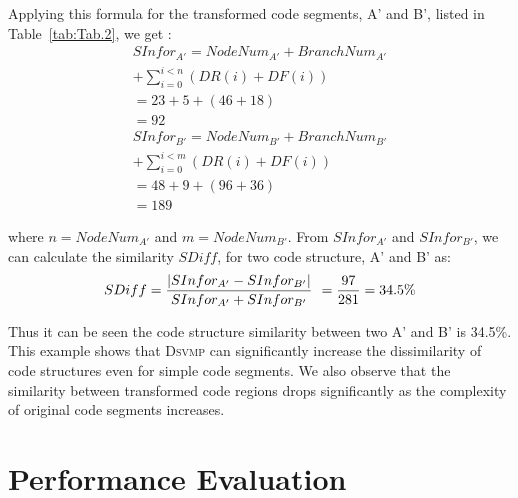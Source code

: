 \documentclass[conference]{IEEEtran}
\newcommand{\DSVMP}{\textsc{Dsvmp}\xspace}
\begin{document}
Applying this formula for the transformed code segments, A' and  B', listed in Table~\ref{tab:Tab.2},  we get :
\[\begin{array}{l}
 SInfo{r_{A'}} = NodeNu{m_{A'}} + BranchNu{m_{A'}} \\
                                                 + \sum\limits_{i = 0}^{i < n} {(DR(i) + DF(i))} \\
                                       = 23 + 5 + (46 + 18)\\
                                       = 92 \\
 SInfo{r_{B'}} = NodeNu{m_{B'}} + BranchNu{m_{B'}} \\
                                                 + \sum\limits_{i = 0}^{i < m} {(DR(i) + DF(i))}  \\
                                        = 48 + 9 + (96 + 36)\\
                                        =  189
\end{array}\]

where $n=NodeNu{m_{A'}}$ and $m=NodeNu{m_{B'}}$. From $SInfo{r_{A'}}$ and $SInfo{r_{B'}}$, we can calculate the similarity $SDiff$, for two code structure, A' and B' as:
\[SDiff = \frac{{|SInfo{r_{A'}} - SInfo{r_{B'}}|}}{{SInfo{r_{A'}} + SInfo{r_{B'}}}}\;{\kern 1pt}  = \frac{{97}}{{281}} = 34.5\% \]

Thus it can be seen the code structure similarity between two A' and B' is  34.5\%. This example shows that \DSVMP can significantly
increase the dissimilarity of code structures even for simple code segments. We also observe that the similarity between transformed code
regions drops significantly as the complexity of original code segments increases.

\section{Performance Evaluation}
\end{document}
